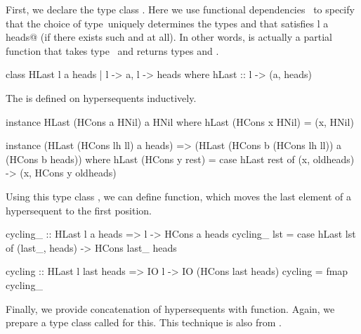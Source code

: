First, we declare the type class \verb@HLast@.
Here we use functional dependencies~\citep{mark_jones2000} to specify
that the choice of type~\verb@l@ uniquely determines the types \verb@a@ and
\verb@heads@ that satisfies \verb@HLast l a heads@ (if there exists such
\verb@a@ and \verb@heads@ at all).
In other words, \verb@HLast@ is actually a partial function that takes
type~\verb@l@
and returns types \verb@a@ and \verb@heads@.
\begin{code}
class HLast l a heads | l -> a, l -> heads
 where hLast :: l -> (a, heads)
\end{code}
The \verb@HLast@ is defined on hypersequents inductively.
\begin{code}
instance HLast (HCons a HNil) a HNil
    where hLast (HCons x HNil) = (x, HNil)

instance (HLast (HCons lh ll) a heads) =>
  (HLast (HCons b (HCons lh ll)) a (HCons b heads))
    where hLast (HCons y rest) =
              case hLast rest of
                (x, oldheads) -> (x, HCons y oldheads)
\end{code}
Using this type class \verb@HLast@, we can define \verb@cycling@ function,
which moves the last element of a hypersequent to the first position.
\begin{code}
cycling_ :: HLast l a heads => l -> HCons a heads
cycling_ lst = case hLast lst of
                (last_, heads) -> HCons last_ heads

cycling :: HLast l last heads => IO l -> IO (HCons last heads)
cycling = fmap cycling_
\end{code}
Finally, we provide concatenation of hypersequents with \verb@follows@
function.
Again, we prepare a type class called \verb@HAppend@ for this.
This technique is also from \citet{hetero}.


